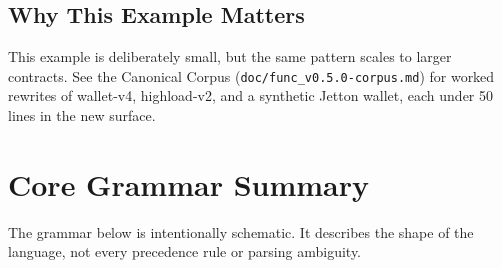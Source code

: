 \documentclass[12pt,oneside]{article}
\begin{document}
\subsection{Why This Example Matters}
This example is deliberately small, but the same pattern scales to
larger contracts. See the Canonical Corpus
(\verb|doc/func_v0.5.0-corpus.md|) for worked rewrites of wallet-v4,
highload-v2, and a synthetic Jetton wallet, each under 50 lines in the
new surface.

\section{Core Grammar Summary}
\label{sec:grammar}
The grammar below is intentionally schematic. It describes the shape of the
language, not every precedence rule or parsing ambiguity.
\end{document}
